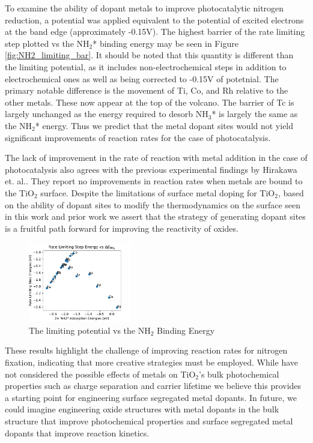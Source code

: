To examine the ability of dopant metals to improve photocatalytic nitrogen reduction, a potential was applied equivalent to the potential of excited electrons at the band edge (approximately -0.15V). The highest barrier of the rate limiting step plotted vs the NH$_2$* binding energy may be seen in Figure \ref{fig:NH2_limiting_bar}. It should be noted that this quantity is different than the limiting potential, as it includes non-electrochemical steps in addition to electrochemical ones as well as being corrected to -0.15V of potetnial. The primary notable difference is the movement of Ti, Co, and Rh relative to the other metals. These now appear at the top of the volcano. The barrier of Tc is largely unchanged as the energy required to desorb NH$_3$* is largely the same as the NH$_2$* energy. Thus we predict that the metal dopant sites would not yield significant improvements of reaction rates for the case of photocatalysis.

The lack of improvement in the rate of reaction with metal addition in the case of photocatalysis also agrees with the previous experimental findings by Hirakawa et. al.\cite{Hirakawa_2017}. They report no improvements in reaction rates when metals are bound to the TiO$_2$ surface. Despite the limitations of surface metal doping for TiO$_2$, based on the ability of dopant sites to modify the thermodynamics on the surface seen in this work and prior work \cite{Garc_a_Mota_2011,Xu_2015,Yao_2017,} we assert that the strategy of generating dopant sites is a fruitful path forward for improving the reactivity of oxides. 


\begin{figure}
    \centering
    \includegraphics[width=0.4\textwidth]{Images/NH2_v_limiting_pot.pdf}
    
    \caption{The limiting potential vs the NH$_2$ Binding Energy}
    \label{fig:NH2_limiting_pot}
\end{figure}

These results highlight the challenge of improving reaction rates for nitrogen fixation, indicating that more creative strategies must be employed. While have not considered the possible effects of metals on TiO$_2$'s bulk photochemical properties such as charge separation and carrier lifetime we believe this provides a starting point for engineering surface segregated metal dopants. In future, we could imagine engineering oxide structures with metal dopants in the bulk structure that improve photochemical properties and surface segregated metal dopants that improve reaction kinetics.

